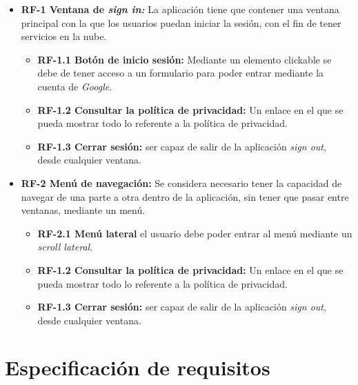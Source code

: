 \begin{itemize}
\tightlist
	\item \textbf{RF-1 Ventana de \emph{sign in:}} La aplicación tiene que contener una ventana principal con la que los usuarios puedan iniciar la sesión, con el fin de tener servicios en la nube.
	
	\begin{itemize}
	\tightlist
	\item \textbf{RF-1.1 Botón de inicio sesión:} Mediante un elemento clickable se debe de tener acceso a un formulario para poder entrar mediante la cuenta de \emph{Google}.
	\item \textbf{RF-1.2 Consultar la política de privacidad:} Un enlace en el que se pueda mostrar todo lo referente a la política de privacidad.
	\item \textbf{RF-1.3 Cerrar sesión:} ser capaz de salir de la aplicación \emph{sign out}, desde cualquier ventana.
	\end{itemize}
	
	\item \textbf{RF-2 Menú de navegación:} Se considera necesario tener la capacidad de navegar de una parte a otra dentro de la aplicación, sin tener que pasar entre ventanas, mediante un menú. 
	
	\begin{itemize}
		\tightlist
		\item \textbf{RF-2.1 Menú lateral} el usuario debe poder entrar al menú mediante un \emph{scroll lateral}.
		\item \textbf{RF-1.2 Consultar la política de privacidad:} Un enlace en el que se pueda mostrar todo lo referente a la política de privacidad.
		\item \textbf{RF-1.3 Cerrar sesión:} ser capaz de salir de la aplicación \emph{sign out}, desde cualquier ventana.
	\end{itemize}
	
\end{itemize}


\section{Especificación de requisitos}


